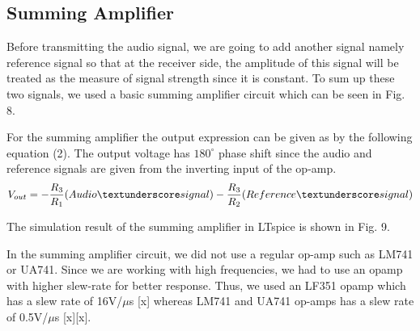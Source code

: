 \documentclass[conference]{IEEEtran}
\begin{document}
\subsection{Summing Amplifier}
Before transmitting the audio signal, we are going to add another signal namely reference signal so that at the receiver side, the amplitude of this signal will be treated as the measure of signal strength since it is constant. To sum up these two signals, we used a basic summing amplifier circuit which can be seen in Fig. 8.
\par For the summing amplifier the output expression can be given as by the following equation (2). The output voltage has \(180^\circ\) phase shift since the audio and reference signals are given from the inverting input of the op-amp.  
\begin{equation}\label{eq:3}
         V_{out} = -\frac{R_3}{R_1} \mbox{(Audio\textunderscore signal)} - \frac{R_3}{R_2} \mbox{(Reference\textunderscore signal)}
 \end{equation}
 \par The simulation result of the summing amplifier in LTspice is shown in Fig. 9.
 \par In the summing amplifier circuit, we did not use a regular op-amp such as LM741 or UA741. Since we are working with high frequencies, we had to use an opamp with higher slew-rate for better response. Thus, we used an LF351 opamp which has a slew rate of 16V/\(\mu\)s [x] whereas LM741 and UA741 op-amps has a slew rate of 0.5V/\(\mu\)s [x][x].
\end{document}
